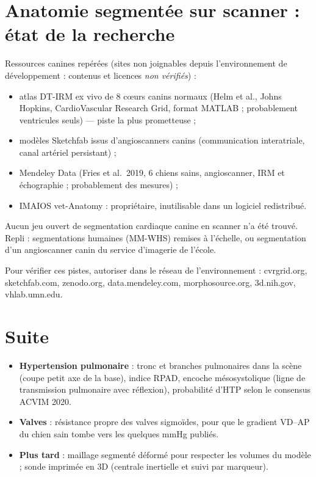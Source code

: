 \documentclass[10pt,a4paper]{article}
\begin{document}
\section{Anatomie segmentée sur scanner : état de la recherche}
Ressources canines repérées (sites non joignables depuis l'environnement de développement : contenus et licences
\emph{non vérifiés}) :
\begin{itemize}
\item atlas DT-IRM ex vivo de 8 cœurs canins normaux (Helm et al., Johns Hopkins, CardioVascular Research Grid,
format MATLAB ; probablement ventricules seuls) --- piste la plus prometteuse ;
\item modèles Sketchfab issus d'angioscanners canins (communication interatriale, canal artériel persistant) ;
\item Mendeley Data (Fries et al.\ 2019, 6 chiens sains, angioscanner, IRM et échographie ; probablement des mesures) ;
\item IMAIOS vet-Anatomy : propriétaire, inutilisable dans un logiciel redistribué.
\end{itemize}
Aucun jeu ouvert de segmentation cardiaque canine en scanner n'a été trouvé. Repli : segmentations humaines
(MM-WHS) remises à l'échelle, ou segmentation d'un angioscanner canin du service d'imagerie de l'école.
{\sloppy Pour vérifier ces pistes, autoriser dans le réseau de l'environnement : cvrgrid.org, sketchfab.com, zenodo.org,
data.mendeley.com, morphosource.org, 3d.nih.gov, vhlab.umn.edu.\par}

\section{Suite}
\begin{itemize}
\item \textbf{Hypertension pulmonaire} : tronc et branches pulmonaires dans la scène (coupe petit axe de la base),
indice RPAD, encoche mésosystolique (ligne de transmission pulmonaire avec réflexion), probabilité d'HTP selon le
consensus ACVIM 2020.
\item \textbf{Valves} : résistance propre des valves sigmoïdes, pour que le gradient VD--AP du chien sain tombe vers
les quelques mmHg publiés.
\item \textbf{Plus tard} : maillage segmenté déformé pour respecter les volumes du modèle ; sonde imprimée en 3D
(centrale inertielle et suivi par marqueur).
\end{itemize}
\end{document}
